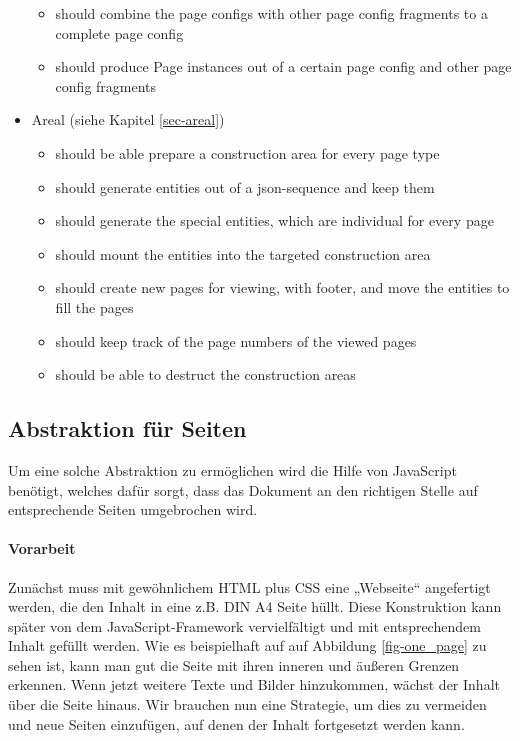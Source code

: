 \begin{itemize}
\begin{itemize}
      \item should combine the page configs with other page config fragments
            to a complete page config
      \item should produce Page instances out of a certain page config and
            other page config fragments
    \end{itemize}
  \item Areal (siehe Kapitel \ref{sec-areal})
    \begin{itemize}
      \item should be able prepare a construction area for every page type
      \item should generate entities out of a json-sequence and keep them
      \item should generate the special entities, which are individual
            for every page
      \item should mount the entities into the targeted construction area
      \item should create new pages for viewing, with footer, and move the
            entities to fill the pages
      \item should keep track of the page numbers of the viewed pages
      \item should be able to destruct the construction areas
    \end{itemize}
\end{itemize}

\subsection{Abstraktion für Seiten}\label{sec-abstrationSeiten}

Um eine solche Abstraktion zu ermöglichen wird die Hilfe von JavaScript
benötigt, welches dafür sorgt, dass das Dokument an den richtigen Stelle auf
entsprechende Seiten umgebrochen wird.

\paragraph{Vorarbeit}
Zunächst muss mit gewöhnlichem HTML plus CSS eine „Webseite“ angefertigt
werden, die den Inhalt in eine z.B. DIN A4 Seite hüllt. Diese Konstruktion
kann später von dem JavaScript-Framework vervielfältigt und mit entsprechendem
Inhalt gefüllt werden. Wie es beispielhaft auf auf Abbildung
\ref{fig-one_page} zu sehen ist,
kann man gut die Seite mit ihren inneren und äußeren
Grenzen erkennen. Wenn jetzt weitere Texte und Bilder
hinzukommen, wächst der Inhalt über die Seite hinaus. Wir brauchen nun
eine Strategie, um dies zu vermeiden und neue Seiten einzufügen, auf denen
der Inhalt fortgesetzt werden kann.

